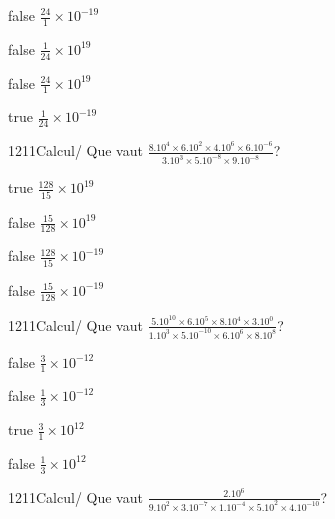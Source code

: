 \documentclass[11pt]{article}
\begin{document}
            \begin{reponses}
                \item[false] $\frac{24}{1}\times 10^{-19}$
                \item[false] $\frac{1}{24}\times 10^{19}$
                \item[false] $\frac{24}{1}\times 10^{19}$
                \item[true] $\frac{1}{24}\times 10^{-19}$
            \end{reponses}
            
            \begin{question}{1211}{Calcul}{}{/}
                Que vaut $\frac{8.10^{4}\times 6.10^{2}\times 4.10^{6}\times 6.10^{-6}}{3.10^{3}\times 5.10^{-8}\times 9.10^{-8}}$?
            \end{question}
            
            \begin{reponses}
                \item[true] $\frac{128}{15}\times 10^{19}$
                \item[false] $\frac{15}{128}\times 10^{19}$
                \item[false] $\frac{128}{15}\times 10^{-19}$
                \item[false] $\frac{15}{128}\times 10^{-19}$
            \end{reponses}
            
            \begin{question}{1211}{Calcul}{}{/}
                Que vaut $\frac{5.10^{10}\times 6.10^{5}\times 8.10^{4}\times 3.10^{0}}{1.10^{3}\times 5.10^{-10}\times 6.10^{6}\times 8.10^{8}}$?
            \end{question}
            
            \begin{reponses}
                \item[false] $\frac{3}{1}\times 10^{-12}$
                \item[false] $\frac{1}{3}\times 10^{-12}$
                \item[true] $\frac{3}{1}\times 10^{12}$
                \item[false] $\frac{1}{3}\times 10^{12}$
            \end{reponses}
            
            \begin{question}{1211}{Calcul}{}{/}
                Que vaut $\frac{2.10^{6}}{9.10^{2}\times 3.10^{-7}\times 1.10^{-4}\times 5.10^{2}\times 4.10^{-10}}$?
            \end{question}
            
\end{document}
